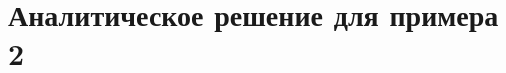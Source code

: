 \documentclass[12pt]{article}
\begin{document}
		\section{Аналитическое решение для примера 2}
	\begin{figure}[h]
	\end{figure}
	\begin{figure}[h]
\end{figure}
\end{document}
